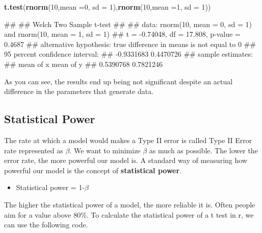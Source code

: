 \documentclass[
]{book}
\newenvironment{Shaded}{\begin{snugshade}}{\end{snugshade}}
\newcommand{\AttributeTok}[1]{\textcolor[rgb]{0.13,0.29,0.53}{#1}}
\newcommand{\DecValTok}[1]{\textcolor[rgb]{0.00,0.00,0.81}{#1}}
\newcommand{\FunctionTok}[1]{\textcolor[rgb]{0.13,0.29,0.53}{\textbf{#1}}}
\newcommand{\NormalTok}[1]{#1}
\providecommand{\tightlist}{%
  \setlength{\itemsep}{0pt}\setlength{\parskip}{0pt}}
\begin{document}
\begin{Shaded}
\begin{Highlighting}[]
\FunctionTok{t.test}\NormalTok{(}\FunctionTok{rnorm}\NormalTok{(}\DecValTok{10}\NormalTok{,}\AttributeTok{mean =}\DecValTok{0}\NormalTok{, }\AttributeTok{sd =} \DecValTok{1}\NormalTok{),}\FunctionTok{rnorm}\NormalTok{(}\DecValTok{10}\NormalTok{,}\AttributeTok{mean =}\DecValTok{1}\NormalTok{, }\AttributeTok{sd =} \DecValTok{1}\NormalTok{))}
\end{Highlighting}
\end{Shaded}

\begin{Shaded}
\begin{Highlighting}[]
\NormalTok{\#\# }
\NormalTok{\#\#  Welch Two Sample t{-}test}
\NormalTok{\#\# }
\NormalTok{\#\# data:  rnorm(10, mean = 0, sd = 1) and rnorm(10, mean = 1, sd = 1)}
\NormalTok{\#\# t = {-}0.74048, df = 17.808, p{-}value = 0.4687}
\NormalTok{\#\# alternative hypothesis: true difference in means is not equal to 0}
\NormalTok{\#\# 95 percent confidence interval:}
\NormalTok{\#\#  {-}0.9331683  0.4470726}
\NormalTok{\#\# sample estimates:}
\NormalTok{\#\# mean of x mean of y }
\NormalTok{\#\# 0.5390768 0.7821246}
\end{Highlighting}
\end{Shaded}

As you can see, the results end up being not significant despite an actual difference in the parameters that generate data.

\subsection{Statistical Power}\label{statistical-power}

The rate at which a model would makes a Type II error is called Type II Error rate represented as \(\beta\). We want to minimize \(\beta\) as much as possible. The lower the error rate, the more powerful our model is. A standard way of measuring how powerful our model is the concept of \textbf{statistical power}.

\begin{itemize}
\tightlist
\item
  Statistical power = 1-\(\beta\)
\end{itemize}

The higher the statistical power of a model, the more reliable it is. Often people aim for a value above 80\%. To calculate the statistical power of a t test in r, we can use the following code.
\end{document}
